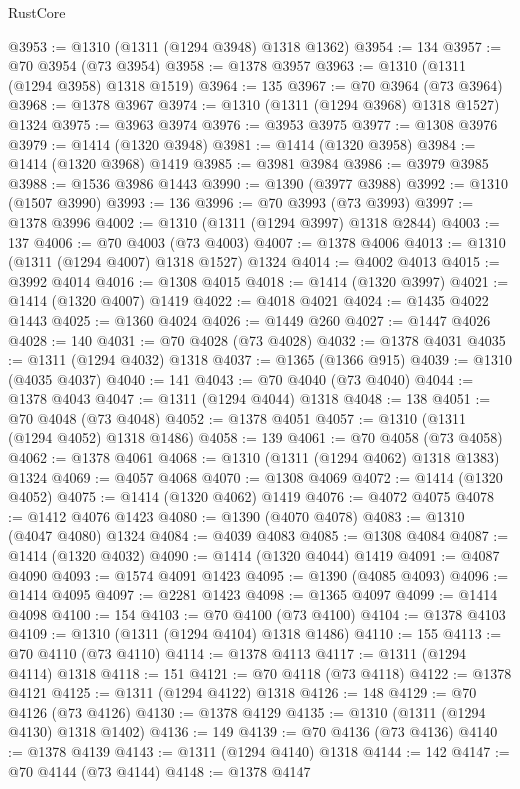 \begin{lexlean}{RustCore}
\begin{coremodule}
@3953 := @1310 (@1311 (@1294 @3948) @1318 @1362)
@3954 := 134
@3957 := @70 @3954 (@73 @3954)
@3958 := @1378 @3957
@3963 := @1310 (@1311 (@1294 @3958) @1318 @1519)
@3964 := 135
@3967 := @70 @3964 (@73 @3964)
@3968 := @1378 @3967
@3974 := @1310 (@1311 (@1294 @3968) @1318 @1527) @1324
@3975 := @3963 @3974
@3976 := @3953 @3975
@3977 := @1308 @3976
@3979 := @1414 (@1320 @3948)
@3981 := @1414 (@1320 @3958)
@3984 := @1414 (@1320 @3968) @1419
@3985 := @3981 @3984
@3986 := @3979 @3985
@3988 := @1536 @3986 @1443
@3990 := @1390 (@3977 @3988)
@3992 := @1310 (@1507 @3990)
@3993 := 136
@3996 := @70 @3993 (@73 @3993)
@3997 := @1378 @3996
@4002 := @1310 (@1311 (@1294 @3997) @1318 @2844)
@4003 := 137
@4006 := @70 @4003 (@73 @4003)
@4007 := @1378 @4006
@4013 := @1310 (@1311 (@1294 @4007) @1318 @1527) @1324
@4014 := @4002 @4013
@4015 := @3992 @4014
@4016 := @1308 @4015
@4018 := @1414 (@1320 @3997)
@4021 := @1414 (@1320 @4007) @1419
@4022 := @4018 @4021
@4024 := @1435 @4022 @1443
@4025 := @1360 @4024
@4026 := @1449 @260
@4027 := @1447 @4026
@4028 := 140
@4031 := @70 @4028 (@73 @4028)
@4032 := @1378 @4031
@4035 := @1311 (@1294 @4032) @1318
@4037 := @1365 (@1366 @915)
@4039 := @1310 (@4035 @4037)
@4040 := 141
@4043 := @70 @4040 (@73 @4040)
@4044 := @1378 @4043
@4047 := @1311 (@1294 @4044) @1318
@4048 := 138
@4051 := @70 @4048 (@73 @4048)
@4052 := @1378 @4051
@4057 := @1310 (@1311 (@1294 @4052) @1318 @1486)
@4058 := 139
@4061 := @70 @4058 (@73 @4058)
@4062 := @1378 @4061
@4068 := @1310 (@1311 (@1294 @4062) @1318 @1383) @1324
@4069 := @4057 @4068
@4070 := @1308 @4069
@4072 := @1414 (@1320 @4052)
@4075 := @1414 (@1320 @4062) @1419
@4076 := @4072 @4075
@4078 := @1412 @4076 @1423
@4080 := @1390 (@4070 @4078)
@4083 := @1310 (@4047 @4080) @1324
@4084 := @4039 @4083
@4085 := @1308 @4084
@4087 := @1414 (@1320 @4032)
@4090 := @1414 (@1320 @4044) @1419
@4091 := @4087 @4090
@4093 := @1574 @4091 @1423
@4095 := @1390 (@4085 @4093)
@4096 := @1414 @4095
@4097 := @2281 @1423
@4098 := @1365 @4097
@4099 := @1414 @4098
@4100 := 154
@4103 := @70 @4100 (@73 @4100)
@4104 := @1378 @4103
@4109 := @1310 (@1311 (@1294 @4104) @1318 @1486)
@4110 := 155
@4113 := @70 @4110 (@73 @4110)
@4114 := @1378 @4113
@4117 := @1311 (@1294 @4114) @1318
@4118 := 151
@4121 := @70 @4118 (@73 @4118)
@4122 := @1378 @4121
@4125 := @1311 (@1294 @4122) @1318
@4126 := 148
@4129 := @70 @4126 (@73 @4126)
@4130 := @1378 @4129
@4135 := @1310 (@1311 (@1294 @4130) @1318 @1402)
@4136 := 149
@4139 := @70 @4136 (@73 @4136)
@4140 := @1378 @4139
@4143 := @1311 (@1294 @4140) @1318
@4144 := 142
@4147 := @70 @4144 (@73 @4144)
@4148 := @1378 @4147

\end{coremodule}
\end{lexlean}
